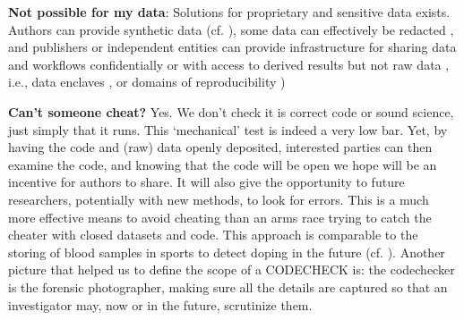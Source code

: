 \documentclass[12pt]{article}
\begin{document}
\textbf{Not possible for my data}: 
Solutions for proprietary and sensitive data exists.
Authors can provide synthetic data (cf. \cite{shannon_opening_2018}), some
data can effectively be redacted \cite{oloughlin_data_2015}, and publishers or
independent entities can provide infrastructure for sharing data and workflows
confidentially \cite{perignon_certify_2019} or with access to derived results
but not raw data \cite{shannon_opening_2018},
i.e., data enclaves \cite{foster_research_2018},
or domains of reproducibility \cite{harris_more_2017})

\textbf{Can't someone cheat?} Yes. We don't check it is correct code or
sound science,
just simply that it runs. This `mechanical' test is indeed a very low bar.
Yet, by having the code and (raw) data openly deposited, interested parties can
then examine the code, and knowing that the code will be open we hope will
be an incentive for authors to share. It will also give the opportunity 
to future researchers, potentially with new methods, to look for errors.
This is a much more effective means to avoid cheating than an arms race
trying to catch the cheater with closed datasets and code. This approach
is comparable to the storing of blood samples in sports to detect
doping in the future (cf. \cite{everythinghertz97}).
Another picture that helped us to define the scope of a CODECHECK is:
the codechecker is the forensic photographer, making sure all the details
are captured so that an investigator may, now or in the future, scrutinize
them.
\end{document}

